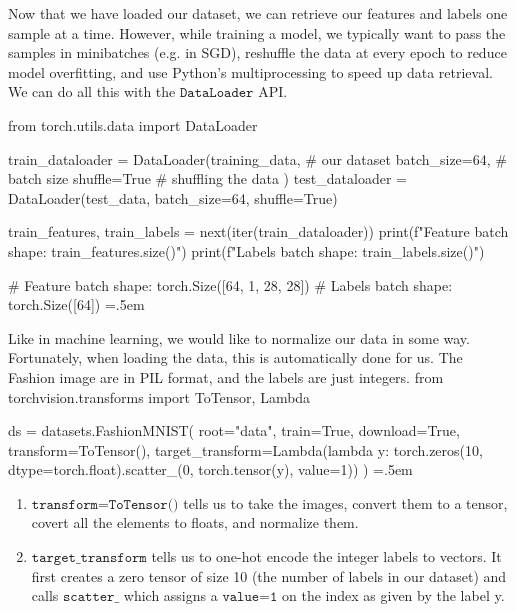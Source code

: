 \documentclass{article}
\newenvironment{cverbatim}
 {\SaveVerbatim{cverb}}
 {\endSaveVerbatim
  \flushleft\fboxrule=0pt\fboxsep=.5em
  \colorbox{cverbbg}{%
    \makebox[\dimexpr\linewidth-2\fboxsep][l]{\BUseVerbatim{cverb}}%
  }
  \endflushleft
}
\theoremstyle{definition}
\theoremstyle{remark}
\theoremstyle{definition}
\begin{document}
Now that we have loaded our dataset, we can retrieve our features and labels one sample at a time. However, while training a model, we typically want to pass the samples in minibatches (e.g. in SGD), reshuffle the data at every epoch to reduce model overfitting, and use Python's multiprocessing to speed up data retrieval. We can do all this with the $\texttt{DataLoader}$ API. 

\begin{cverbatim}
from torch.utils.data import DataLoader

train_dataloader = DataLoader(training_data,    # our dataset
                              batch_size=64,    # batch size
                              shuffle=True      # shuffling the data
                            )
test_dataloader = DataLoader(test_data, batch_size=64, shuffle=True)

train_features, train_labels = next(iter(train_dataloader))
print(f"Feature batch shape: {train_features.size()}")
print(f"Labels batch shape: {train_labels.size()}")

# Feature batch shape: torch.Size([64, 1, 28, 28])
# Labels batch shape: torch.Size([64])
\end{cverbatim}

Like in machine learning, we would like to normalize our data in some way. Fortunately, when loading the data, this is automatically done for us. The Fashion image are in PIL format, and the labels are just integers. 
\begin{cverbatim}
from torchvision.transforms import ToTensor, Lambda

ds = datasets.FashionMNIST(
    root="data",
    train=True,
    download=True,
    transform=ToTensor(),
    target_transform=Lambda(lambda y: torch.zeros(10, dtype=torch.float).scatter_(0, 
        torch.tensor(y), value=1))
)
\end{cverbatim}
\begin{enumerate}
    \item $\texttt{transform=ToTensor()}$ tells us to take the images, convert them to a tensor, covert all the elements to floats, and normalize them. 
    \item $\texttt{target\_transform}$ tells us to one-hot encode the integer labels to vectors. It first creates a zero tensor of size 10 (the number of labels in our dataset) and calls $\texttt{scatter\_}$ which assigns a $\texttt{value=1}$ on the index as given by the label y.
\end{enumerate}
\end{document}
